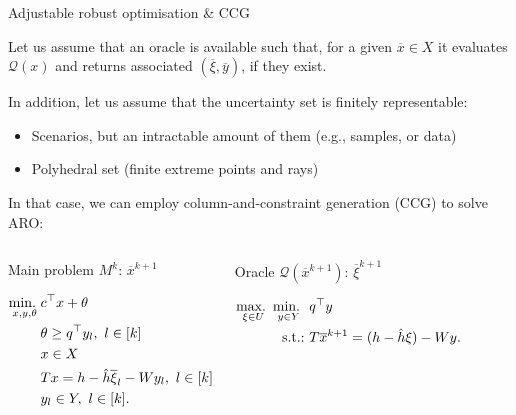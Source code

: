 \begin{frame}{Adjustable robust optimisation \& CCG}

	Let us assume that an \alert{oracle} is available such that, for a given $\overline{x} \in X$ it evaluates $\mathcal{Q}(x)$ and returns associated $(\overline{\xi}, \overline{y})$, if they exist.
	
	\pause
	In addition, let us assume that the uncertainty set is \alert{finitely} representable:
	\vspace{-6pt}
	\begin{itemize}
		\item Scenarios, but an \alert{intractable amount} of them (e.g., samples, or data)
		\item \alert{Polyhedral} set (finite extreme points and rays)	
	\end{itemize}
	
	\pause
	In that case, we can employ \alert{column-and-constraint generation} (CCG) {\small \cite{zeng2013solving}} to solve ARO: 
	
	\vspace{-12pt}
	\begin{columns}
	\begin{block}{Main problem $M^k$: $\overline{x}^{k+1}$} \small 
	
	\vspace{-21pt}
	\begin{align*}
		\mathop{\text{min.} \ }_{x,y,\theta} & c^\top x + \theta \\
		& \theta \geq q^\top y_l, \ l \in [k] \\
		& x \in X \\ 
		& Tx = h - \hat{h} \overline{\xi}_l - Wy_l, \  l \in [k] \\
		& y_l \in Y, \ l \in [k].
	\end{align*}
	\end{block}

	\begin{block}{Oracle $\mathcal{Q}(\overline{x}^{k+1})$: $\overline{\xi}^{k+1}$} \small 
	
	\vspace{-21pt}
	\begin{align*}
		\mathop{\text{max.} \ }_{\xi \in U} \mathop{\text{min.} \ }_{y \in Y}~ & q^\top y \\
		\text{s.t.:~} & T\overline{x}^{k+1} = (h - \hat{h}\xi) - Wy.
	\end{align*}
	\end{block}		
	\end{columns}
	
\end{frame}


